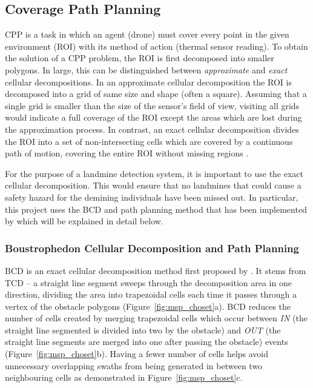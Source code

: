 \subsection{Coverage Path Planning}
\label{sec:msp_cpp}

\gls{CPP} is a task in which an agent (drone) must cover every point in the given environment (\gls{ROI}) with its method of action (thermal sensor reading). To obtain the solution of a \gls{CPP} problem, the \gls{ROI} is first decomposed into smaller polygons. In large, this can be distinguished between \textit{approximate} and \textit{exact} cellular decompositions. In an approximate cellular decomposition the \gls{ROI} is decomposed into a grid of same size and shape (often a square). Assuming that a single grid is smaller than the size of the sensor's field of view, visiting all grids would indicate a full coverage of the \gls{ROI} except the areas which are lost during the approximation process. In contrast, an exact cellular decomposition divides the \gls{ROI} into a set of non-intersecting cells which are covered by a continuous path of motion, covering the entire \gls{ROI} without missing regions \cite{choset2001surveycpp}. 

For the purpose of a landmine detection system, it is important to use the exact cellular decomposition. This would ensure that no landmines that could cause a safety hazard for the demining individuals have been missed out. In particular, this project uses the \gls{BCD} and path planning method that has been implemented by \cite{bahnemann2021cpp} which will be explained in detail below.  

\subsubsection{Boustrophedon Cellular Decomposition and Path Planning}

\gls{BCD} is an exact cellular decomposition method first proposed by \cite{choset1998bcd}. It stems from \gls{TCD} -- a straight line segment sweeps through the decomposition area in one direction, dividing the area into trapezoidal cells each time it passes through a vertex of the obstacle polygons (Figure~\ref{fig:msp_choset}a). \gls{BCD} reduces the number of cells created by merging trapezoidal cells which occur between \textit{IN} (the straight line segmented is divided into two by the obstacle) and \textit{OUT} (the straight line segments are merged into one after passing the obstacle) events (Figure~\ref{fig:msp_choset}b). Having a fewer number of cells helps avoid unnecessary overlapping swaths from being generated in between two neighbouring cells as demonstrated in Figure~\ref{fig:msp_choset}c. 


